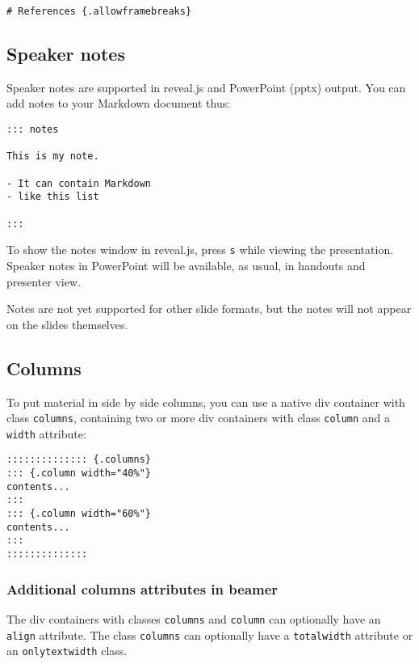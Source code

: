 \documentclass[]{article}
\begin{document}
\begin{verbatim}
# References {.allowframebreaks}
\end{verbatim}

\hypertarget{speaker-notes}{%
\subsection{Speaker notes}\label{speaker-notes}}

Speaker notes are supported in reveal.js and PowerPoint (pptx) output.
You can add notes to your Markdown document thus:

\begin{verbatim}
::: notes

This is my note.

- It can contain Markdown
- like this list

:::
\end{verbatim}

To show the notes window in reveal.js, press \texttt{s} while viewing
the presentation. Speaker notes in PowerPoint will be available, as
usual, in handouts and presenter view.

Notes are not yet supported for other slide formats, but the notes will
not appear on the slides themselves.

\hypertarget{columns}{%
\subsection{Columns}\label{columns}}

To put material in side by side columns, you can use a native div
container with class \texttt{columns}, containing two or more div
containers with class \texttt{column} and a \texttt{width} attribute:

\begin{verbatim}
:::::::::::::: {.columns}
::: {.column width="40%"}
contents...
:::
::: {.column width="60%"}
contents...
:::
::::::::::::::
\end{verbatim}

\hypertarget{additional-columns-attributes-in-beamer}{%
\subsubsection{Additional columns attributes in
beamer}\label{additional-columns-attributes-in-beamer}}

The div containers with classes \texttt{columns} and \texttt{column} can
optionally have an \texttt{align} attribute. The class \texttt{columns}
can optionally have a \texttt{totalwidth} attribute or an
\texttt{onlytextwidth} class.
\end{document}
